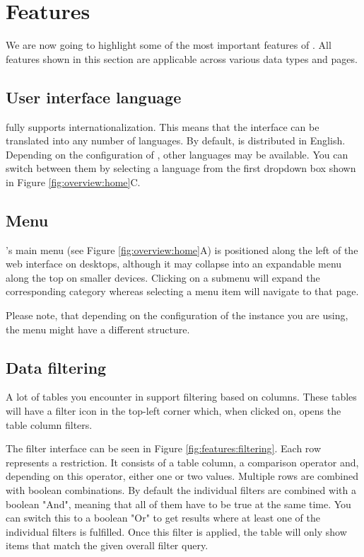 \section{Features}
We are now going to highlight some of the most important features of {\germinate}. All features shown in this section are applicable across various data types and pages.

\subsection{User interface language}
\label{sec:features:language-selector}
{\germinate} fully supports internationalization. This means that the interface can be translated into any number of languages. By default, {\germinate} is distributed in English. Depending on the configuration of {\germinate}, other languages may be available. You can switch between them by selecting a language from the first dropdown box shown in Figure \ref{fig:overview:home}C.

\subsection{Menu}
\label{sec:features:menu}
{\germinate}'s main menu (see Figure \ref{fig:overview:home}A) is positioned along the left of the web interface on desktops, although it may collapse into an expandable menu along the top on smaller devices. Clicking on a submenu will expand the corresponding category whereas selecting a menu item will navigate to that page.

Please note, that depending on the configuration of the {\germinate} instance you are using, the menu might have a different structure.

\subsection{Data filtering}
\label{sec:features:filtering}
A lot of tables you encounter in {\germinate} support filtering based on columns. These tables will have a filter icon in the top-left corner which, when clicked on, opens the table column filters.

The filter interface can be seen in Figure \ref{fig:features:filtering}. Each row represents a restriction. It consists of a table column, a comparison operator and, depending on this operator, either one or two values. Multiple rows are combined with boolean combinations. By default the individual filters are combined with a boolean "And", meaning that all of them have to be true at the same time. You can switch this to a boolean "Or" to get results where at least one of the individual filters is fulfilled. Once this filter is applied, the table will only show items that match the given overall filter query.

